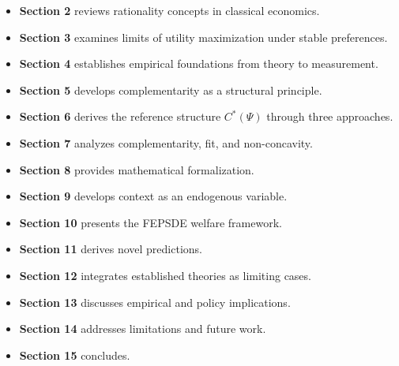 \documentclass[12pt,a4paper]{article}
\begin{document}
\begin{itemize}
    \item \textbf{Section 2} reviews rationality concepts in classical economics.
    
    \item \textbf{Section 3} examines limits of utility maximization under stable preferences.
    
    \item \textbf{Section 4} establishes empirical foundations from theory to measurement.
    
    \item \textbf{Section 5} develops complementarity as a structural principle.
    
    \item \textbf{Section 6} derives the reference structure $C^*(\Psi)$ through three approaches.
    
    \item \textbf{Section 7} analyzes complementarity, fit, and non-concavity.
    
    \item \textbf{Section 8} provides mathematical formalization.
    
    \item \textbf{Section 9} develops context as an endogenous variable.
    
    \item \textbf{Section 10} presents the FEPSDE welfare framework.
    
    \item \textbf{Section 11} derives novel predictions.
    
    \item \textbf{Section 12} integrates established theories as limiting cases.
    
    \item \textbf{Section 13} discusses empirical and policy implications.
    
    \item \textbf{Section 14} addresses limitations and future work.
    
    \item \textbf{Section 15} concludes.
\end{itemize}
\end{document}
